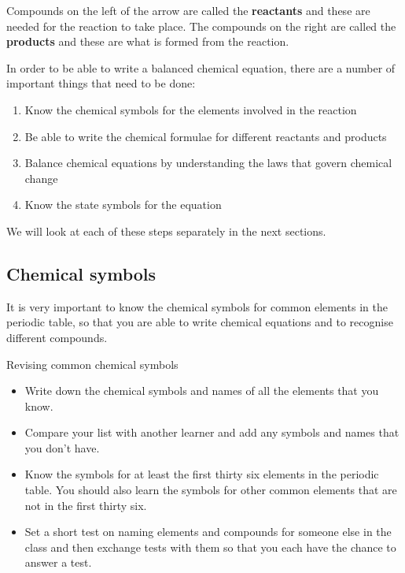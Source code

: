       \label{m38721*id62659}Compounds on the left of the arrow are called the \textbf{reactants} and these are needed for the reaction to take place. The compounds on the right are called the \textbf{products} and these are what is formed from the reaction.\par 
      \label{m38721*id62675}In order to be able to write a balanced chemical equation, there are a number of important things that need to be done:\par 
      \label{m38721*id62681}\begin{enumerate}[noitemsep, label=\textbf{\arabic*}. ] 
            \label{m38721*uid1}\item Know the chemical symbols for the elements involved in the reaction
\label{m38721*uid2}\item Be able to write the chemical formulae for different reactants and products
\label{m38721*uid3}\item Balance chemical equations by understanding the laws that govern chemical change
\label{m38721*uid4}\item Know the state symbols for the equation
\end{enumerate}
      \label{m38721*id62733}We will look at each of these steps separately in the next sections.\par 
    \label{m38721*cid2}
            \subsection*{Chemical symbols}
            \nopagebreak
      \label{m38721*id62746}It is very important to know the chemical symbols for common elements in the periodic table, so that you are able to write chemical equations and to recognise different compounds. 
\label{m38721*secfhsst!!!underscore!!!id109}
            \begin{activity}{Revising common chemical symbols }
            \nopagebreak
      \label{m38721*id62763}\begin{itemize}[noitemsep]
            \label{m38721*uid5}\item Write down the chemical symbols and names of all the elements that you know.
\label{m38721*uid6}\item Compare your list with another learner and add any symbols and names that you don't have.
\label{m38721*uid7}\item Know the symbols for at least the first thirty six elements in the periodic table. You should also learn the symbols for other common elements that are not in the first thirty six.
\label{m38721*uid8}\item Set a short test on naming elements and compounds for someone else in the class and then exchange tests with them so that you each have the chance to answer a test.
\end{itemize}
\end{activity}
    \label{m38721*cid3}
